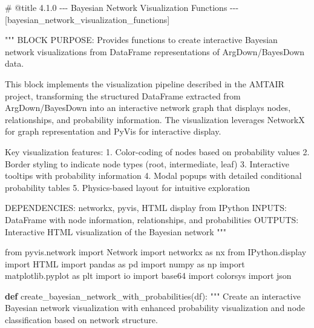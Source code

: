 \documentclass[
  11pt,
  letterpaper,
]{book}
\newenvironment{Shaded}{\begin{snugshade}}{\end{snugshade}}
\newcommand{\CommentTok}[1]{\textcolor[rgb]{0.37,0.37,0.37}{#1}}
\newcommand{\ImportTok}[1]{\textcolor[rgb]{0.00,0.46,0.62}{#1}}
\newcommand{\KeywordTok}[1]{\textcolor[rgb]{0.00,0.23,0.31}{\textbf{#1}}}
\newcommand{\NormalTok}[1]{\textcolor[rgb]{0.00,0.23,0.31}{#1}}
\begin{document}
\label{bayesian_network_visualization_functions}
\begin{Shaded}
\begin{Highlighting}[]
\CommentTok{\# @title 4.1.0 {-}{-}{-} Bayesian Network Visualization Functions {-}{-}{-} [bayesian\_network\_visualization\_functions]}

\CommentTok{"""}
\CommentTok{BLOCK PURPOSE: Provides functions to create interactive Bayesian network}
\CommentTok{visualizations from DataFrame representations of ArgDown/BayesDown data.}

\CommentTok{This block implements the visualization pipeline described in the AMTAIR project,}
\CommentTok{transforming the structured DataFrame extracted from ArgDown/BayesDown into an}
\CommentTok{interactive network graph that displays nodes, relationships, and probability}
\CommentTok{information. The visualization leverages NetworkX for graph representation and}
\CommentTok{PyVis for interactive display.}

\CommentTok{Key visualization features:}
\CommentTok{1. Color{-}coding of nodes based on probability values}
\CommentTok{2. Border styling to indicate node types (root, intermediate, leaf)}
\CommentTok{3. Interactive tooltips with probability information}
\CommentTok{4. Modal popups with detailed conditional probability tables}
\CommentTok{5. Physics{-}based layout for intuitive exploration}

\CommentTok{DEPENDENCIES: networkx, pyvis, HTML display from IPython}
\CommentTok{INPUTS: DataFrame with node information, relationships, and probabilities}
\CommentTok{OUTPUTS: Interactive HTML visualization of the Bayesian network}
\CommentTok{"""}

\ImportTok{from}\NormalTok{ pyvis.network }\ImportTok{import}\NormalTok{ Network}
\ImportTok{import}\NormalTok{ networkx }\ImportTok{as}\NormalTok{ nx}
\ImportTok{from}\NormalTok{ IPython.display }\ImportTok{import}\NormalTok{ HTML}
\ImportTok{import}\NormalTok{ pandas }\ImportTok{as}\NormalTok{ pd}
\ImportTok{import}\NormalTok{ numpy }\ImportTok{as}\NormalTok{ np}
\ImportTok{import}\NormalTok{ matplotlib.pyplot }\ImportTok{as}\NormalTok{ plt}
\ImportTok{import}\NormalTok{ io}
\ImportTok{import}\NormalTok{ base64}
\ImportTok{import}\NormalTok{ colorsys}
\ImportTok{import}\NormalTok{ json}

\KeywordTok{def}\NormalTok{ create\_bayesian\_network\_with\_probabilities(df):}
    \CommentTok{"""}
\CommentTok{    Create an interactive Bayesian network visualization with enhanced}
\CommentTok{    probability visualization and node classification based on network structure.}


\end{Highlighting}
\end{Shaded}
\end{document}

